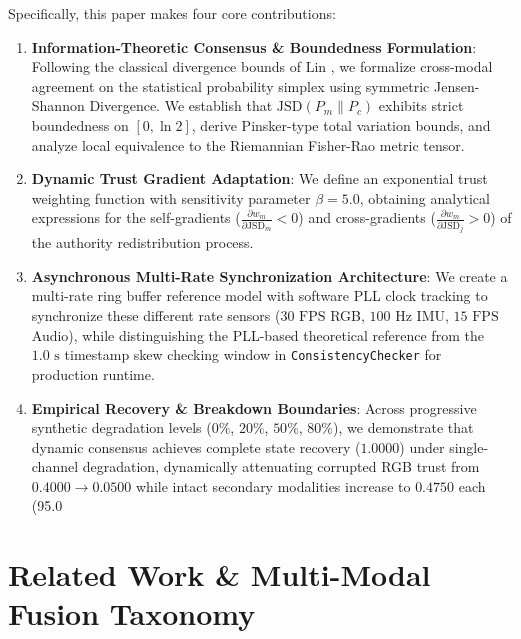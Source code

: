 \documentclass[conference]{IEEEtran}
\begin{document}
Specifically, this paper makes four core contributions:
\begin{enumerate}
    \item \textbf{Information-Theoretic Consensus \& Boundedness Formulation}: Following the classical divergence bounds of Lin \cite{lin1991divergence}, we formalize cross-modal agreement on the statistical probability simplex using symmetric Jensen-Shannon Divergence. We establish that $\mathrm{JSD}(P_m \parallel P_c)$ exhibits strict boundedness on $[0, \ln 2]$, derive Pinsker-type total variation bounds, and analyze local equivalence to the Riemannian Fisher-Rao metric tensor.
    \item \textbf{Dynamic Trust Gradient Adaptation}: We define an exponential trust weighting function with sensitivity parameter $\beta = 5.0$, obtaining analytical expressions for the self-gradients ($\frac{\partial w_m}{\partial \mathrm{JSD}_m} < 0$) and cross-gradients ($\frac{\partial w_m}{\partial \mathrm{JSD}_j} > 0$) of the authority redistribution process.
    \item \textbf{Asynchronous Multi-Rate Synchronization Architecture}: We create a multi-rate ring buffer reference model with software PLL clock tracking to synchronize these different rate sensors ($30\text{ FPS}$ RGB, $100\text{ Hz}$ IMU, $15\text{ FPS}$ Audio), while distinguishing the PLL-based theoretical reference from the $1.0\text{ s}$ timestamp skew checking window in \texttt{ConsistencyChecker} for production runtime.
    \item \textbf{Empirical Recovery \& Breakdown Boundaries}: Across progressive synthetic degradation levels ($0\%$, $20\%$, $50\%$, $80\%$), we demonstrate that dynamic consensus achieves complete state recovery ($1.0000$) under single-channel degradation, dynamically attenuating corrupted RGB trust from $0.4000 \to 0.0500$ while intact secondary modalities increase to $0.4750$ each (95.0%
\end{enumerate}

\section{Related Work \& Multi-Modal Fusion Taxonomy}
\end{document}

